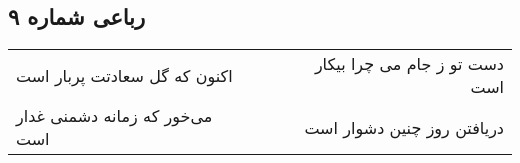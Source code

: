 \begin{center}
\section*{رباعی شماره ۹}
\label{sec:sh009}
\begin{longtable}{l p{0.5cm} r}
اکنون که گل سعادتت پربار است
&&
دست تو ز جام می چرا بیکار است
\\
می‌خور که زمانه دشمنی غدار است
&&
دریافتن روز چنین دشوار است
\\
\end{longtable}
\end{center}
